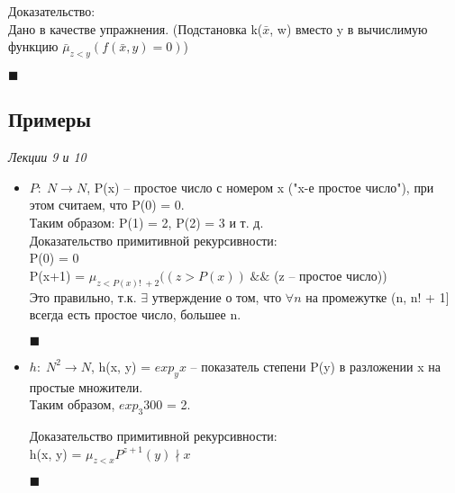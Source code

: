         Доказательство:\\
        Дано в качестве упражнения. (Подстановка k($\bar x$, w) вместо y в вычислимую функцию $\bar \mu_{z < y} (f(\bar x, y) = 0)$)
        \begin{flushright}
            $\blacksquare$\\
        \end{flushright}
        
    \subsection{Примеры}
    \emph{Лекции 9 и 10}\\
        \begin{itemize}
            \item $P:\; N \rightarrow N$, P(x) -- простое число с номером x ("x-е простое число"), при этом считаем, что P(0) = 0.\\
            Таким образом: P(1) = 2, P(2) = 3 и т. д.\\
            
            Доказательство примитивной рекурсивности:\\
            P(0) = 0\\
            P(x+1) = $\mu_{z < P(x)!\; + 2}((z > P(x))\; \&\& $  (z -- простое число))\\
            Это правильно, т.к. $\exists$ утверждение о том, что $\forall n $ на промежутке (n, n! + 1] всегда есть простое число, большее n.
            \begin{flushright}
                $\blacksquare$\\
            \end{flushright}
            
            \item $h:\; N^{2} \rightarrow N$, h(x, y) = $exp_y x$ -- показатель степени P(y) в разложении x на простые множители. \\
            Таким образом, $exp_3 300$ = 2.
            
            Доказательство примитивной рекурсивности:\\
            h(x, y) = $\mu_{z < x} P^{z+1}(y) \nmid x $
            \begin{flushright}
                $\blacksquare$\\
            \end{flushright}
        \end{itemize}
        
